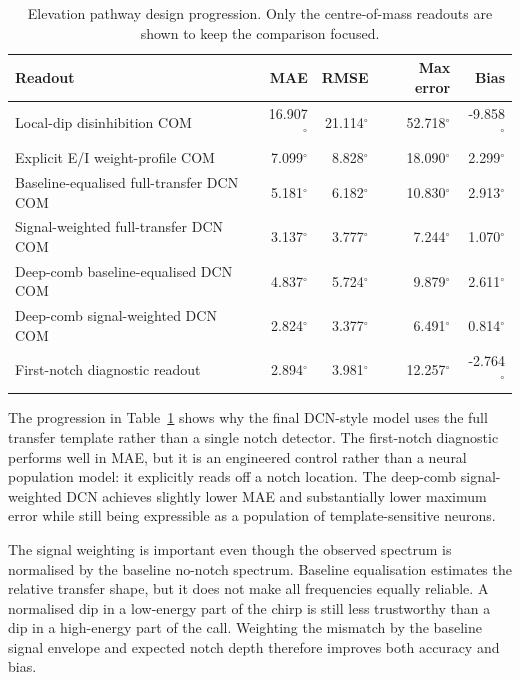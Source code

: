 \begin{table}[H]
    \centering
    \caption{Elevation pathway design progression. Only the centre-of-mass readouts are shown to keep the comparison focused.}
    \label{tab:elevation_design_progression}
    \small
    \begin{tabular}{lrrrr}
        \toprule
        Readout & MAE & RMSE & Max error & Bias \\
        \midrule
        Local-dip disinhibition COM & 16.907$^\circ$ & 21.114$^\circ$ & 52.718$^\circ$ & -9.858$^\circ$ \\
        Explicit E/I weight-profile COM & 7.099$^\circ$ & 8.828$^\circ$ & 18.090$^\circ$ & 2.299$^\circ$ \\
        Baseline-equalised full-transfer DCN COM & 5.181$^\circ$ & 6.182$^\circ$ & 10.830$^\circ$ & 2.913$^\circ$ \\
        Signal-weighted full-transfer DCN COM & 3.137$^\circ$ & 3.777$^\circ$ & 7.244$^\circ$ & 1.070$^\circ$ \\
        Deep-comb baseline-equalised DCN COM & 4.837$^\circ$ & 5.724$^\circ$ & 9.879$^\circ$ & 2.611$^\circ$ \\
        Deep-comb signal-weighted DCN COM & 2.824$^\circ$ & 3.377$^\circ$ & 6.491$^\circ$ & 0.814$^\circ$ \\
        First-notch diagnostic readout & 2.894$^\circ$ & 3.981$^\circ$ & 12.257$^\circ$ & -2.764$^\circ$ \\
        \bottomrule
    \end{tabular}
\end{table}

The progression in Table~\ref{tab:elevation_design_progression} shows why the final DCN-style model uses the full transfer template rather than a single notch detector. The first-notch diagnostic performs well in MAE, but it is an engineered control rather than a neural population model: it explicitly reads off a notch location. The deep-comb signal-weighted DCN achieves slightly lower MAE and substantially lower maximum error while still being expressible as a population of template-sensitive neurons.

The signal weighting is important even though the observed spectrum is normalised by the baseline no-notch spectrum. Baseline equalisation estimates the relative transfer shape, but it does not make all frequencies equally reliable. A normalised dip in a low-energy part of the chirp is still less trustworthy than a dip in a high-energy part of the call. Weighting the mismatch by the baseline signal envelope and expected notch depth therefore improves both accuracy and bias.

